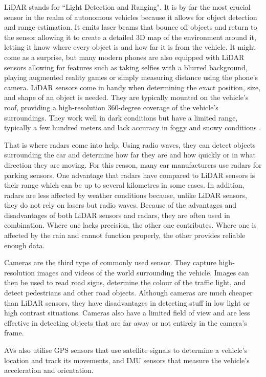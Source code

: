 LiDAR stands for ``Light Detection and Ranging". It is by far the most crucial sensor in the realm of autonomous vehicles because it allows for object detection and range estimation. It emits laser beams that bounce off objects and return to the sensor allowing it to create a detailed 3D map of the environment around it, letting it know where every object is and how far it is from the vehicle. It might come as a surprise, but many modern phones are also equipped with LiDAR sensors allowing for features such as taking selfies with a blurred background, playing augmented reality games or simply measuring distance using the phone's camera. LiDAR sensors come in handy when determining the exact position, size, and shape of an object is needed. They are typically mounted on the vehicle's roof, providing a high-resolution 360-degree coverage of the vehicle's surroundings. They work well in dark conditions but have a limited range, typically a few hundred meters and lack accuracy in foggy and snowy conditions \cite{vargas2021overview}.

That is where radars come into help. Using radio waves, they can detect objects surrounding the car and determine how far they are and how quickly or in what direction they are moving. For this reason, many car manufacturers use radars for parking sensors. One advantage that radars have compared to LiDAR sensors is their range which can be up to several kilometres in some cases. In addition, radars are less affected by weather conditions because, unlike LiDAR sensors, they do not rely on lasers but radio waves.
Because of the advantages and disadvantages of both LiDAR sensors and radars, they are often used in combination. Where one lacks precision, the other one contributes. Where one is affected by the rain and cannot function properly, the other provides reliable enough data.

Cameras are the third type of commonly used sensor. They capture high-resolution images and videos of the world surrounding the vehicle. Images can then be used to read road signs, determine the colour of the traffic light, and detect pedestrians and other road objects. Although cameras are much cheaper than LiDAR sensors, they have disadvantages in detecting stuff in low light or high contrast situations. Cameras also have a limited field of view and are less effective in detecting objects that are far away or not entirely in the camera's frame.

AVs also utilise GPS sensors that use satellite signals to determine a vehicle's location and track its movements, and IMU sensors that measure the vehicle's acceleration and orientation.

